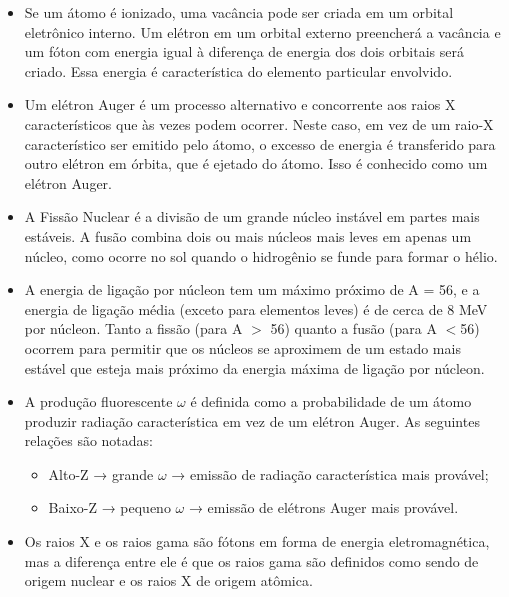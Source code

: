 \documentclass[11pt,a4paper]{article}
\newcounter{exemplo}
\begin{document}
\begin{exemplo}
\begin{itemize}
        \item Se um átomo é ionizado, uma vacância pode ser criada em um orbital eletrônico interno. Um elétron em um orbital externo preencherá a vacância e um fóton com energia igual à diferença de energia dos dois orbitais será criado. Essa energia é característica do elemento particular envolvido.
        
        \item Um elétron Auger é um processo alternativo e concorrente aos raios X característicos que às vezes podem ocorrer. Neste caso, em vez de um raio-X característico ser emitido pelo átomo, o excesso de energia é transferido para outro elétron em órbita, que é ejetado do átomo. Isso é conhecido como um elétron Auger.
        
        \item A Fissão Nuclear é a divisão de um grande núcleo instável em partes mais estáveis. A fusão combina dois ou mais núcleos mais leves em apenas um núcleo, como ocorre no sol quando o hidrogênio se funde para formar o hélio.
        
        \item A energia de ligação por núcleon tem um máximo próximo de A = 56, e a energia de ligação média (exceto para elementos leves) é de cerca de 8 MeV por núcleon. Tanto a fissão (para A $>$ 56) quanto a fusão (para A $<$56) ocorrem para permitir que os núcleos se aproximem de um estado mais estável que esteja mais próximo da energia máxima de ligação por núcleon.
        
        \item A produção fluorescente $\omega$ é definida como a probabilidade de um átomo produzir radiação característica em vez de um elétron Auger. As seguintes relações são notadas:
            \begin{itemize}
                \item Alto-Z → grande $\omega$ → emissão de radiação característica mais provável;
                \item Baixo-Z → pequeno $\omega$ → emissão de elétrons Auger mais provável.
            \end{itemize}
           
       \item Os raios X e os raios gama são fótons em forma de energia eletromagnética, mas a diferença entre ele é que os raios gama são definidos como sendo de origem nuclear e os raios X de origem atômica.
       
       
    \end{itemize}


\end{exemplo}
\end{document}
